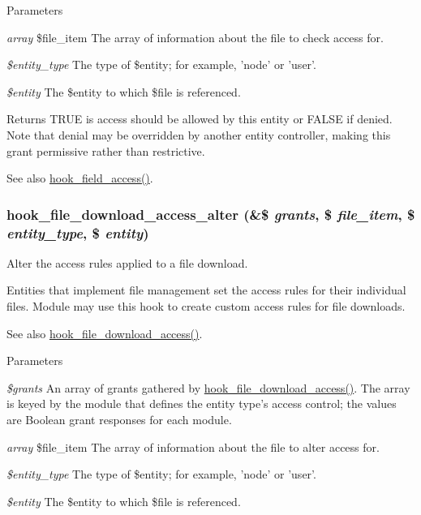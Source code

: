 \begin{DoxyParams}{Parameters}
\item[{\em array}]\$file\_\-item The array of information about the file to check access for. \item[{\em \$entity\_\-type}]The type of \$entity; for example, 'node' or 'user'. \item[{\em \$entity}]The \$entity to which \$file is referenced.\end{DoxyParams}
\begin{DoxyReturn}{Returns}
TRUE is access should be allowed by this entity or FALSE if denied. Note that denial may be overridden by another entity controller, making this grant permissive rather than restrictive.
\end{DoxyReturn}
\begin{DoxySeeAlso}{See also}
\hyperlink{group__hooks_ga9281312bdad448a24f3cfb7e341b36ba}{hook\_\-field\_\-access()}. 
\end{DoxySeeAlso}
\hypertarget{file_8api_8php_a7e22cfd274f391fcf170c4f1619921ab}{
\subsubsection[{hook\_\-file\_\-download\_\-access\_\-alter}]{\setlength{\rightskip}{0pt plus 5cm}hook\_\-file\_\-download\_\-access\_\-alter (\&\$ {\em grants}, \/  \$ {\em file\_\-item}, \/  \$ {\em entity\_\-type}, \/  \$ {\em entity})}}
\label{file_8api_8php_a7e22cfd274f391fcf170c4f1619921ab}
Alter the access rules applied to a file download.

Entities that implement file management set the access rules for their individual files. Module may use this hook to create custom access rules for file downloads.

\begin{DoxySeeAlso}{See also}
\hyperlink{file_8api_8php_ae72c8feceec1072762bffc3ba020aa2a}{hook\_\-file\_\-download\_\-access()}.
\end{DoxySeeAlso}

\begin{DoxyParams}{Parameters}
\item[{\em \$grants}]An array of grants gathered by \hyperlink{file_8api_8php_ae72c8feceec1072762bffc3ba020aa2a}{hook\_\-file\_\-download\_\-access()}. The array is keyed by the module that defines the entity type's access control; the values are Boolean grant responses for each module. \item[{\em array}]\$file\_\-item The array of information about the file to alter access for. \item[{\em \$entity\_\-type}]The type of \$entity; for example, 'node' or 'user'. \item[{\em \$entity}]The \$entity to which \$file is referenced. \end{DoxyParams}
